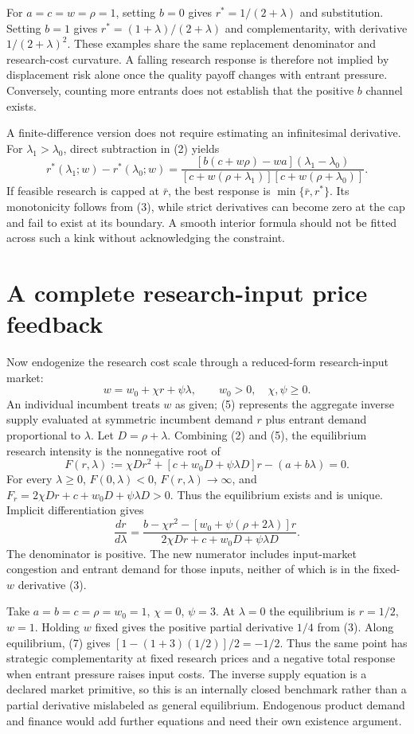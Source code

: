 \documentclass[11pt,a4paper]{article}
\begin{document}
For $a=c=w=\rho=1$, setting $b=0$ gives $r^*=1/(2+\lambda)$ and substitution. Setting $b=1$ gives $r^*=(1+\lambda)/(2+\lambda)$ and complementarity, with derivative $1/(2+\lambda)^2$. These examples share the same replacement denominator and research-cost curvature. A falling research response is therefore not implied by displacement risk alone once the quality payoff changes with entrant pressure. Conversely, counting more entrants does not establish that the positive $b$ channel exists.

A finite-difference version does not require estimating an infinitesimal derivative. For $\lambda_1>\lambda_0$, direct subtraction in (2) yields
\[
 r^*(\lambda_1;w)-r^*(\lambda_0;w)
 =\frac{[b(c+w\rho)-wa](\lambda_1-\lambda_0)}
 {[c+w(\rho+\lambda_1)][c+w(\rho+\lambda_0)]}.             \tag{4}
\]
If feasible research is capped at $\bar r$, the best response is $\min\{\bar r,r^*\}$. Its monotonicity follows from (3), while strict derivatives can become zero at the cap and fail to exist at its boundary. A smooth interior formula should not be fitted across such a kink without acknowledging the constraint.

\section{A complete research-input price feedback}
Now endogenize the research cost scale through a reduced-form research-input market:
\[
 w=w_0+\chi r+\psi\lambda,\qquad
 w_0>0,\quad\chi,\psi\ge0.                              \tag{5}
\]
An individual incumbent treats $w$ as given; (5) represents the aggregate inverse supply evaluated at symmetric incumbent demand $r$ plus entrant demand proportional to $\lambda$. Let $D=\rho+\lambda$. Combining (2) and (5), the equilibrium research intensity is the nonnegative root of
\[
 F(r,\lambda):=\chi D r^2+[c+w_0D+\psi\lambda D]r
                         -(a+b\lambda)=0.                \tag{6}
\]
For every $\lambda\ge0$, $F(0,\lambda)<0$, $F(r,\lambda)\to\infty$, and
$F_r=2\chi Dr+c+w_0D+\psi\lambda D>0$. Thus the equilibrium exists and is unique. Implicit differentiation gives
\[
 \frac{dr}{d\lambda}=
 \frac{b-\chi r^2-[w_0+\psi(\rho+2\lambda)]r}
 {2\chi Dr+c+w_0D+\psi\lambda D}.                         \tag{7}
\]
The denominator is positive. The new numerator includes input-market congestion and entrant demand for those inputs, neither of which is in the fixed-$w$ derivative (3).

Take $a=b=c=\rho=w_0=1$, $\chi=0$, $\psi=3$. At $\lambda=0$ the equilibrium is $r=1/2$, $w=1$. Holding $w$ fixed gives the positive partial derivative $1/4$ from (3). Along equilibrium, (7) gives
$[1-(1+3)(1/2)]/2=-1/2$. Thus the same point has strategic complementarity at fixed research prices and a negative total response when entrant pressure raises input costs. The inverse supply equation is a declared market primitive, so this is an internally closed benchmark rather than a partial derivative mislabeled as general equilibrium. Endogenous product demand and finance would add further equations and need their own existence argument.
\end{document}
